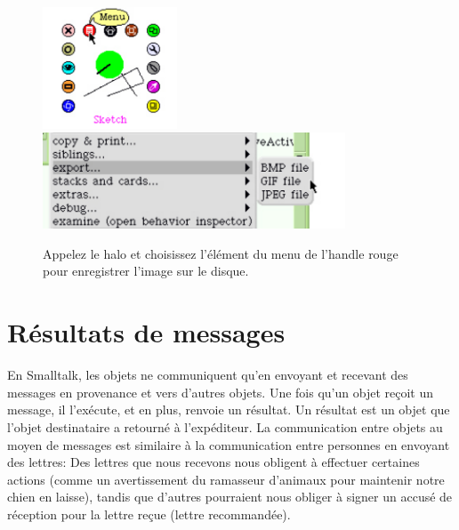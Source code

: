 \documentclass[a4paper,10pt,twoside]{book}
\begin{document}
\begin{figure}
\begin{center}
\includegraphics[width=4cm]{sketchWithHalo}\includegraphics[width=9cm]{sketchExportMenu}
\caption{Appelez le halo et choisissez l'\'el\'ement   du menu de l'handle rouge pour enregistrer l'image sur le disque.} \label{sketchWithHalo}
\end{center}
\end{figure}



\section{R\'esultats de messages}

En Smalltalk, les objets ne communiquent qu'en envoyant et recevant des messages en provenance et vers d'autres objets. Une fois qu'un objet re\c coit un message, il l'ex\'ecute, et en plus, renvoie un r\'esultat. Un r\'esultat est un objet que l'objet destinataire a retourn\'e \`a l'exp\'editeur. La communication entre objets au moyen de messages est similaire \`a la communication entre personnes en envoyant des lettres: Des lettres que nous recevons nous obligent \`a effectuer certaines actions (comme un avertissement du ramasseur d'animaux pour maintenir notre chien en laisse), tandis que d'autres pourraient nous obliger \`a signer un accus\'e de r\'eception pour  la lettre re\c cue (lettre recommand\'ee).
\end{document}
